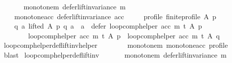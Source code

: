 \begin{isabellebody}
\ \ \isanewline
\ \ \ \ monotone{\isacharunderscore}{\kern0pt}m{\isacharcolon}{\kern0pt}\ {\isachardoublequoteopen}defer{\isacharunderscore}{\kern0pt}lift{\isacharunderscore}{\kern0pt}invariance\ m{\isachardoublequoteclose}\ \isanewline
\ \ \ \ monotone{\isacharunderscore}{\kern0pt}acc{\isacharcolon}{\kern0pt}\ {\isachardoublequoteopen}defer{\isacharunderscore}{\kern0pt}lift{\isacharunderscore}{\kern0pt}invariance\ acc{\isachardoublequoteclose}\ \isanewline
\ \ \ \ profile{\isacharcolon}{\kern0pt}\ {\isachardoublequoteopen}finite{\isacharunderscore}{\kern0pt}profile\ A\ p{\isachardoublequoteclose}\isanewline
\ \ \isanewline
\ \ \ \ {\isachardoublequoteopen}{\isasymforall}q\ a{\isachardot}{\kern0pt}\ {\isacharparenleft}{\kern0pt}lifted\ A\ p\ q\ a\ {\isasymand}\ a\ {\isasymin}\ {\isacharparenleft}{\kern0pt}defer\ {\isacharparenleft}{\kern0pt}loop{\isacharunderscore}{\kern0pt}comp{\isacharunderscore}{\kern0pt}helper\ acc\ m\ t{\isacharparenright}{\kern0pt}\ A\ p{\isacharparenright}{\kern0pt}{\isacharparenright}{\kern0pt}\ {\isasymlongrightarrow}\isanewline
\ \ \ \ \ \ \ \ {\isacharparenleft}{\kern0pt}loop{\isacharunderscore}{\kern0pt}comp{\isacharunderscore}{\kern0pt}helper\ acc\ m\ t{\isacharparenright}{\kern0pt}\ A\ p\ {\isacharequal}{\kern0pt}\ {\isacharparenleft}{\kern0pt}loop{\isacharunderscore}{\kern0pt}comp{\isacharunderscore}{\kern0pt}helper\ acc\ m\ t{\isacharparenright}{\kern0pt}\ A\ q{\isachardoublequoteclose}\isanewline
%
\isadelimproof
\ \ %
\endisadelimproof
%
\isatagproof
{}\isamarkupfalse%
\ loop{\isacharunderscore}{\kern0pt}comp{\isacharunderscore}{\kern0pt}helper{\isacharunderscore}{\kern0pt}def{\isacharunderscore}{\kern0pt}lift{\isacharunderscore}{\kern0pt}inv{\isacharunderscore}{\kern0pt}helper\isanewline
\ \ \ \ \ \ \ \ monotone{\isacharunderscore}{\kern0pt}m\ monotone{\isacharunderscore}{\kern0pt}acc\ profile\isanewline
\ \ \isamarkupfalse%
\ blast%
\endisatagproof
{\isafoldproof}%
%
\isadelimproof
\isanewline
%
\endisadelimproof
\isanewline
{}\isamarkupfalse%
\ loop{\isacharunderscore}{\kern0pt}comp{\isacharunderscore}{\kern0pt}helper{\isacharunderscore}{\kern0pt}def{\isacharunderscore}{\kern0pt}lift{\isacharunderscore}{\kern0pt}inv{}{\isacharcolon}{\kern0pt}\isanewline
\ \ \isanewline
\ \ \ \ monotone{\isacharunderscore}{\kern0pt}m{\isacharcolon}{\kern0pt}\ {\isachardoublequoteopen}defer{\isacharunderscore}{\kern0pt}lift{\isacharunderscore}{\kern0pt}invariance\ m{\isachardoublequoteclose}\ \isanewline

\end{isabellebody}

